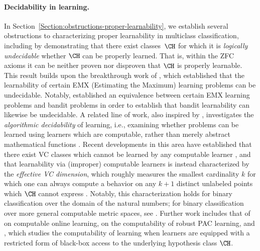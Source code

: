 \paragraph{Decidability in learning.} In Section~\ref{Section:obstructions-proper-learnability}, we establish several obstructions to characterizing proper learnability in multiclass classification, including by demonstrating that there exist classes~$\CH$ for which it is \emph{logically undecidable} whether $\CH$ can be properly learned. That is, within the ZFC axioms it can be neither proven nor disproven that $\CH$ is properly learnable. This result builds upon the breakthrough work of \citet{ben2019learnability}, which established that the learnability of certain EMX (Estimating the Maximum) learning problems can be undecidable. Notably, \citet{bandit-undecidable} established an equivalence between certain EMX learning problems and bandit problems in order to establish that bandit learnability can likewise be undecidable. 
A related line of work, also inspired by \citet{ben2019learnability}, investigates the \emph{algorithmic decidability} of learning, i.e., examining whether problems can be learned using learners which are computable, rather than merely abstract mathematical functions
\citep{agarwal2020learnability}. Recent developments in this area have established that there exist VC classes which cannot be learned by any computable learner \citep{sterkenburg2022characterizations}, and that learnability via (improper) computable learners is instead characterized by the \emph{effective VC dimension}, which roughly measures the smallest cardinality $k$ for which one can always compute a behavior on any $k + 1$ distinct unlabeled points which $\CH$ cannot express \citep{delle2023find}. Notably, this characterization holds for binary classification over the domain of the natural numbers; for binary classification over more general computable metric spaces, see \citet{ackerman2022computable}. 
Further work includes that of \citet{hasrati2023computable} on computable online learning, \citet{gourdeau2024computability} on the computability of robust PAC learning, and \citet{caro2023undecidability}, which studies the computability of learning when learners are equipped with a restricted form of black-box access to the underlying hypothesis class $\CH$.